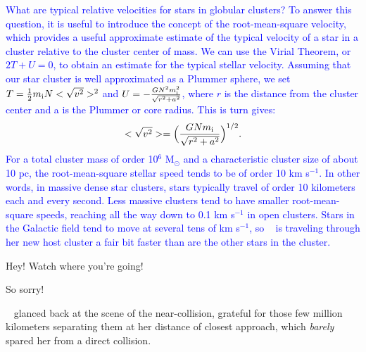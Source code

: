\documentclass[main.tex]{subfiles}
\begin{document}
\begin{tcolorbox}[sharp corners, colback=blue!30, colframe=blue!80!blue, title=Velocity Dispersion]
\par \textcolor{blue} {What are typical relative velocities for stars in globular clusters?  To answer this question, it is useful to introduce the concept of the root-mean-square velocity, which provides a useful approximate estimate of the typical velocity of a star in a cluster relative to the cluster center of mass.  We can use the Virial Theorem, or $2T + U = 0$, to obtain an estimate for the typical stellar velocity.  Assuming that our star cluster is well approximated as a Plummer sphere, we set $T = \frac{1}{2}m_{\rm i}N<\sqrt{v^2}>^2$ and $U = -\frac{GN^2m_{\rm i}^2}{\sqrt{r^2 + a^2}}$, where $r$ is the distance from the cluster center and a is the Plummer or core radius.  This is turn gives:
\begin{equation}
<\sqrt{v^2}> = \Big( \frac{GNm_{\rm i}}{\sqrt{r^2 + a^2}} \Big)^{1/2}.
\end{equation}
For a total cluster mass of order 10$^6$ M$_{\odot}$ and a characteristic cluster size of about 10 pc, the root-mean-square stellar speed tends to be of order 10 km s$^{-1}$.  In other words, in massive dense star clusters, stars typically travel of order 10 kilometers each and every second.  Less massive clusters tend to have smaller root-mean-square speeds, reaching all the way down to 0.1 km s$^{-1}$ in open clusters.  Stars in the Galactic field tend to move at several tens of km s$^{-1}$, so \rmsterope~ is traveling through her new host cluster a fair bit faster than are the other stars in the cluster.
} 
\end{tcolorbox} 

\par \Gene Hey!  Watch where you're going!

\par \Sterope So sorry!

\par \nar \rmsterope~ glanced back at the scene of the near-collision, grateful for those few million kilometers separating them at her distance of closest approach, which \textit{barely} spared her from a direct collision.
\end{document}
